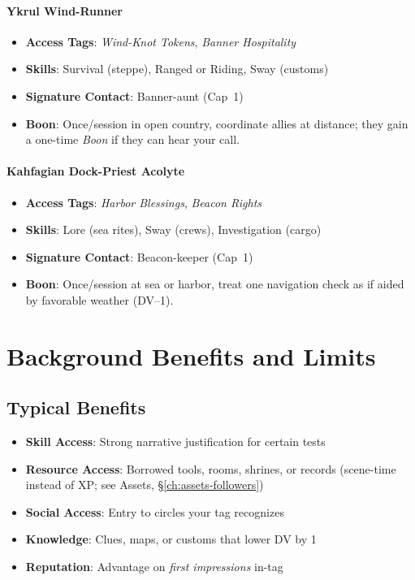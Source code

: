 \paragraph{Ykrul Wind-Runner}
\begin{itemize}
\item \textbf{Access Tags}: \textit{Wind-Knot Tokens}, \textit{Banner Hospitality}
\item \textbf{Skills}: Survival (steppe), Ranged or Riding, Sway (customs)
\item \textbf{Signature Contact}: Banner-aunt (Cap~1)
\item \textbf{Boon}: Once/session in open country, coordinate allies at distance; they gain a one-time \emph{Boon} if they can hear your call.
\end{itemize}

\paragraph{Kahfagian Dock-Priest Acolyte}
\begin{itemize}
\item \textbf{Access Tags}: \textit{Harbor Blessings}, \textit{Beacon Rights}
\item \textbf{Skills}: Lore (sea rites), Sway (crews), Investigation (cargo)
\item \textbf{Signature Contact}: Beacon-keeper (Cap~1)
\item \textbf{Boon}: Once/session at sea or harbor, treat one navigation check as if aided by favorable weather (DV--1).
\end{itemize}

\section{Background Benefits and Limits}

\subsection*{Typical Benefits}
\begin{itemize}
\item \textbf{Skill Access}: Strong narrative justification for certain tests
\item \textbf{Resource Access}: Borrowed tools, rooms, shrines, or records (scene-time instead of XP; see Assets, \S\ref{ch:assets-followers})
\item \textbf{Social Access}: Entry to circles your tag recognizes
\item \textbf{Knowledge}: Clues, maps, or customs that lower DV by 1
\item \textbf{Reputation}: Advantage on \emph{first impressions} in-tag
\end{itemize}

